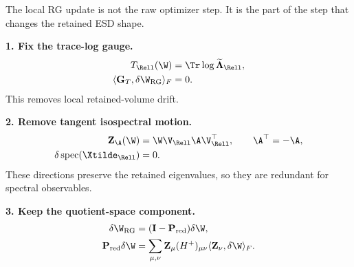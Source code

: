 \begin{tcolorbox}[marginalbox,title=\textbf{Redundant RG directions: local quotient rule}]
The local RG update is not the raw optimizer step.  It is the part of the step that changes the retained ESD shape.

\medskip
\textbf{1. Fix the trace-log gauge.}
\[
\begin{aligned}
  T_{\Rell}(\W)&=\Tr\log\widetilde{\boldsymbol\Lambda}_{\Rell},\\
  \langle\mathbf G_T,\delta\W_{\rm RG}\rangle_F&=0 .
\end{aligned}
\]
This removes local retained-volume drift.

\textbf{2. Remove tangent isospectral motion.}
\[
\begin{aligned}
  \mathbf Z_{\A}(\W)&=\W\V_{\Rell}\A\V_{\Rell}^{\top},
  \qquad \A^\top=-\A,\\
  \delta\operatorname{spec}(\Xtilde_{\Rell})&=0 .
\end{aligned}
\]
These directions preserve the retained eigenvalues, so they are redundant for spectral observables.

\textbf{3. Keep the quotient-space component.}
\[
\begin{aligned}
  \delta\W_{\rm RG}
  &=
  (\mathbf I-\mathbf P_{\rm red})\delta\W,\\
  \mathbf P_{\rm red}\delta\W
  &=
  \sum_{\mu,\nu}\mathbf Z_{\mu}(H^+)_{\mu\nu}
  \langle\mathbf Z_{\nu},\delta\W\rangle_F .
\end{aligned}
\]
\end{tcolorbox}
